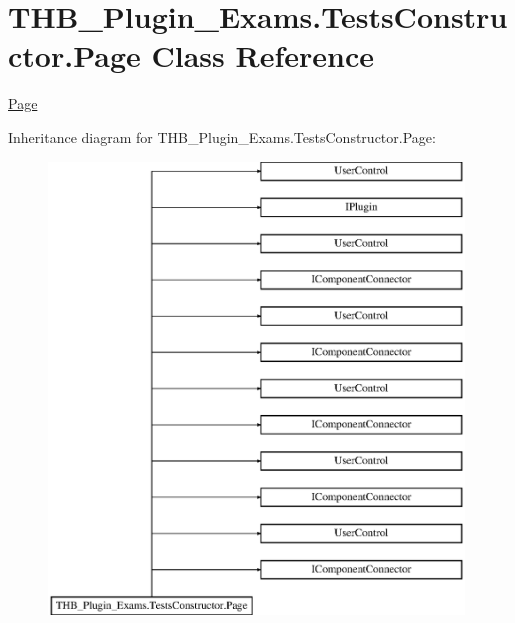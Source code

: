 \hypertarget{class_t_h_b___plugin___exams_1_1_tests_constructor_1_1_page}{}\section{T\+H\+B\+\_\+\+Plugin\+\_\+\+Exams.\+Tests\+Constructor.\+Page Class Reference}
\label{class_t_h_b___plugin___exams_1_1_tests_constructor_1_1_page}


\mbox{\hyperlink{class_t_h_b___plugin___exams_1_1_tests_constructor_1_1_page}{Page}}  


Inheritance diagram for T\+H\+B\+\_\+\+Plugin\+\_\+\+Exams.\+Tests\+Constructor.\+Page\+:\begin{figure}[H]
\begin{center}
\leavevmode
\includegraphics[height=12.000000cm]{d7/d6e/class_t_h_b___plugin___exams_1_1_tests_constructor_1_1_page}
\end{center}
\end{figure}
